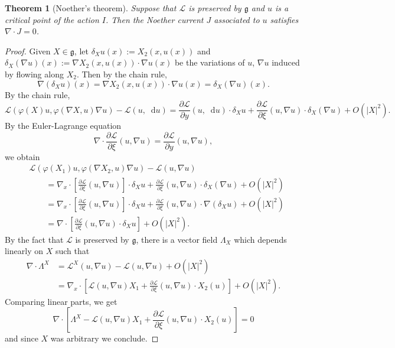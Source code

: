 \documentclass[reqno,11pt]{amsart}
\newcommand*\dif{\mathop{}\!\mathrm{d}}
\newcommand{\Lagrange}{\mathscr L}
\newcommand{\frkg}{\mathfrak g}
\newtheorem{theorem}{Theorem}[section]
\theoremstyle{definition}
\numberwithin{equation}{section}
\begin{document}
\begin{theorem}[Noether's theorem]
Suppose that $\Lagrange$ is preserved by $\frkg$ and $u$ is a critical point of the action $I$.
Then the Noether current $J$ associated to $u$ satisfies $\nabla \cdot J = 0$.
\end{theorem}
\begin{proof}
Given $X \in \frkg$, let $\delta_X u(x) := X_2(x, u(x))$ and $\delta_X (\nabla u)(x) := \nabla X_2(x, u(x)) \cdot \nabla u(x)$ be the variations of $u$, $\nabla u$ induced by flowing along $X_2$.
Then by the chain rule, 
$$\nabla(\delta_X u)(x) = \nabla X_2(x, u(x)) \cdot \nabla u(x) = \delta_X (\nabla u)(x).$$
By the chain rule, 
$$\Lagrange\left(\varphi(X)u, \varphi(\nabla X, u)\nabla u\right) - \Lagrange(u, \dif u) = \frac{\partial \Lagrange}{\partial y}(u, \dif u) \cdot \delta_X u + \frac{\partial \Lagrange}{\partial \xi}(u, \nabla u) \cdot \delta_X(\nabla u) + O(|X|^2).$$
By the Euler-Lagrange equation 
$$\nabla \cdot \frac{\partial \Lagrange}{\partial \xi}(u, \nabla u) = \frac{\partial \Lagrange}{\partial y}(u, \nabla u),$$
we obtain 
\begin{align*}
&\Lagrange\left(\varphi(X_1)u, \varphi(\nabla X_2, u)\nabla u\right) - \Lagrange(u, \nabla u) \\
&\qquad = \nabla_x \cdot \left[\frac{\partial \Lagrange}{\partial \xi}(u, \nabla u)\right] \cdot \delta_X u + \frac{\partial \Lagrange}{\partial \xi}(u, \nabla u) \cdot \delta_X (\nabla u) + O(|X|^2) \\
&\qquad = \nabla_x \cdot \left[\frac{\partial \Lagrange}{\partial \xi}(u, \nabla u)\right] \cdot \delta_X u + \frac{\partial \Lagrange}{\partial \xi}(u, \nabla u) \cdot \nabla (\delta_X u) + O(|X|^2) \\
&\qquad = \nabla \cdot \left[\frac{\partial \Lagrange}{\partial \xi}(u, \nabla u) \cdot \delta_X u\right] + O(|X|^2).
\end{align*}
By the fact that $\Lagrange$ is preserved by $\frkg$, there is a vector field $\Lambda_X$ which depends linearly on $X$ such that
\begin{align*}
  \nabla \cdot \Lambda^X 
  &= \Lagrange^X(u, \nabla u) - \Lagrange(u, \nabla u) + O(|X|^2) \\
  &= \nabla_x \cdot \left[\Lagrange(u, \nabla u) X_1 + \frac{\partial \Lagrange}{\partial \xi}(u, \nabla u) \cdot X_2(u)\right] + O(|X|^2).
\end{align*}
Comparing linear parts, we get 
$$\nabla \cdot \left[\Lambda^X - \Lagrange(u, \nabla u) X_1 + \frac{\partial \Lagrange}{\partial \xi}(u, \nabla u) \cdot X_2(u) \right] = 0$$
and since $X$ was arbitrary we conclude.
\end{proof}
\end{document}
